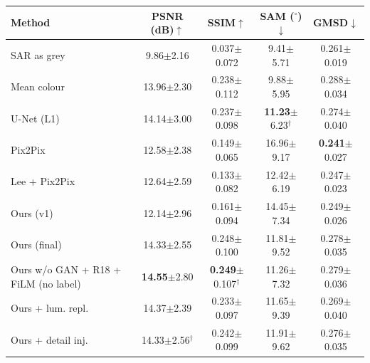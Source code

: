 \begin{tabular}{lcccc}
\toprule
Method & PSNR (dB)$\uparrow$ & SSIM$\uparrow$ & SAM ($^\circ$)$\downarrow$ & GMSD$\downarrow$ \\
\midrule
SAR as grey & 9.86$\pm$2.16 & 0.037$\pm$0.072 & 9.41$\pm$5.71 & 0.261$\pm$0.019 \\
Mean colour & 13.96$\pm$2.30 & 0.238$\pm$0.112 & 9.88$\pm$5.95 & 0.288$\pm$0.034 \\
\midrule
U-Net (L1) & 14.14$\pm$3.00 & 0.237$\pm$0.098 & \textbf{11.23}$\pm$6.23$^\dagger$ & 0.274$\pm$0.040 \\
Pix2Pix & 12.58$\pm$2.38 & 0.149$\pm$0.065 & 16.96$\pm$9.17 & \textbf{0.241}$\pm$0.027 \\
Lee + Pix2Pix & 12.64$\pm$2.59 & 0.133$\pm$0.082 & 12.42$\pm$6.19 & 0.247$\pm$0.023 \\
Ours (v1) & 12.14$\pm$2.96 & 0.161$\pm$0.094 & 14.45$\pm$7.34 & 0.249$\pm$0.026 \\
\midrule
Ours (final) & 14.33$\pm$2.55 & 0.248$\pm$0.100 & 11.81$\pm$9.52 & 0.278$\pm$0.035 \\
Ours w/o GAN + R18 + FiLM (no label) & \textbf{14.55}$\pm$2.80 & \textbf{0.249}$\pm$0.107$^\dagger$ & 11.26$\pm$7.32 & 0.279$\pm$0.036 \\
Ours + lum. repl. & 14.37$\pm$2.39 & 0.233$\pm$0.097 & 11.65$\pm$9.39 & 0.269$\pm$0.040 \\
Ours + detail inj. & 14.33$\pm$2.56$^\dagger$ & 0.242$\pm$0.099 & 11.91$\pm$9.62 & 0.276$\pm$0.035 \\
\bottomrule
\end{tabular}